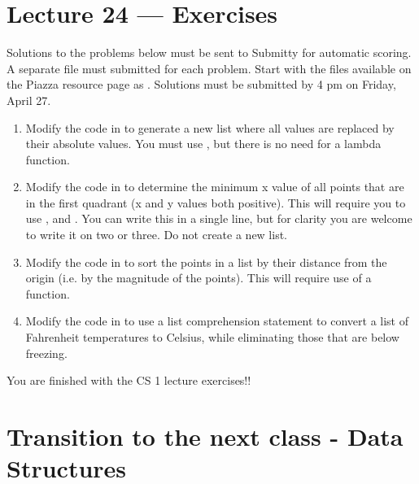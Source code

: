 \documentclass[letterpaper,10pt,english]{sphinxmanual}
\begin{document}
\chapter{Lecture 24 — Exercises}
\label{\detokenize{lecture_notes/lec24_functional_exercises/exercises:lecture-24-exercises}}\label{\detokenize{lecture_notes/lec24_functional_exercises/exercises::doc}}
Solutions to the problems below must be sent to Submitty for
automatic scoring.   A separate file must submitted for each problem.
Start with the files available on the Piazza resource page as
.  Solutions must be submitted by 4 pm on Friday,
April 27. 
\begin{enumerate}
\item {} 
Modify the code in  to generate a new list where all
values are replaced by their absolute values. You must use ,
but there is no need for a lambda function.

\item {} 
Modify the code in  to determine the minimum x value of
all points that are in the first quadrant (x and y values both
positive).  This will require you to use ,  and
.  You can write this in a single line, but for clarity you
are welcome to write it on two or three.  Do not create a new
list.

\item {} 
Modify the code in  to sort the points in a list by
their distance from the origin (i.e. by the magnitude of the
points).  This will require use of a  function.

\item {} 
Modify the code in  to use a list comprehension
statement to convert a list of Fahrenheit temperatures to Celsius,
while eliminating those that are below freezing.

\end{enumerate}

  You are finished with the CS 1 lecture exercises!!


\chapter{Transition to the next class - Data Structures}
\label{\detokenize{lecture_notes/transition:transition-to-the-next-class-data-structures}}\label{\detokenize{lecture_notes/transition::doc}}
\end{document}
